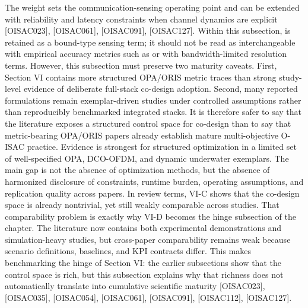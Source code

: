 {}The weight \markdownRendererInlineMath{\alpha} sets the communication-sensing operating point and can be extended with reliability and latency constraints when channel dynamics are explicit [O\markdownRendererUnderscore{}ISAC\markdownRendererUnderscore{}023], [O\markdownRendererUnderscore{}ISAC\markdownRendererUnderscore{}061], [O\markdownRendererUnderscore{}ISAC\markdownRendererUnderscore{}091], [O\markdownRendererUnderscore{}ISAC\markdownRendererUnderscore{}127]. Within this subsection,  is retained as a bound-type sensing term; it should not be read as interchangeable with empirical accuracy metrics such as  or with bandwidth-limited resolution terms. However, this subsection must preserve two maturity caveats. First, Section VI contains more structured OPA/ORIS metric traces than strong study-level evidence of deliberate full-stack co-design adoption. Second, many reported formulations remain exemplar-driven studies under controlled assumptions rather than reproducibly benchmarked integrated stacks. It is therefore safer to say that the literature exposes a structured control space for co-design than to say that metric-bearing OPA/ORIS papers already establish mature multi-objective O-ISAC practice.\markdownRendererParagraphSeparator
{} Evidence is strongest for structured optimization in a limited set of well-specified OPA, DCO-OFDM, and dynamic underwater exemplars. The main gap is not the absence of optimization methods, but the absence of harmonized disclosure of constraints, runtime burden, operating assumptions, and replication quality across papers. In review terms, VI-C shows that the co-design space is already nontrivial, yet still weakly comparable across studies. That comparability problem is exactly why VI-D becomes the hinge subsection of the chapter.\markdownRendererInterblockSeparator
{}
\markdownRendererSectionEnd \markdownRendererSectionBegin
{}\markdownRendererInterblockSeparator
{}The literature now contains both experimental demonstrations and simulation-heavy studies, but cross-paper comparability remains weak because scenario definitions, baselines, and KPI contracts differ. This makes benchmarking the hinge of Section VI: the earlier subsections show that the control space is rich, but this subsection explains why that richness does not automatically translate into cumulative scientific maturity [O\markdownRendererUnderscore{}ISAC\markdownRendererUnderscore{}023], [O\markdownRendererUnderscore{}ISAC\markdownRendererUnderscore{}035], [O\markdownRendererUnderscore{}ISAC\markdownRendererUnderscore{}054], [O\markdownRendererUnderscore{}ISAC\markdownRendererUnderscore{}061], [O\markdownRendererUnderscore{}ISAC\markdownRendererUnderscore{}091], [O\markdownRendererUnderscore{}ISAC\markdownRendererUnderscore{}112], [O\markdownRendererUnderscore{}ISAC\markdownRendererUnderscore{}127].\markdownRendererParagraphSeparator

